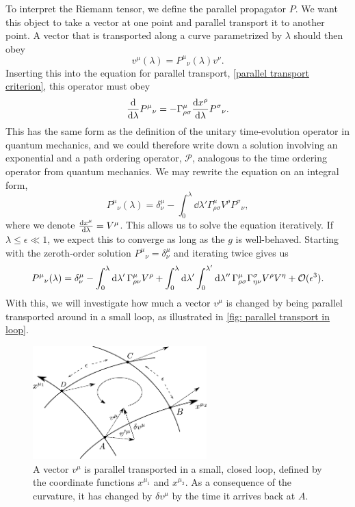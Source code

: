 To interpret the Riemann tensor, we define the parallel propagator $P$.
We want this object to take a vector at one point and parallel transport it to another point.
A vector that is transported along a curve parametrized by $\lambda$ should then obey
%
\begin{equation}
    v^\mu(\lambda) = P^\mu{}_\nu(\lambda) v^\nu.
\end{equation}
%
Inserting this into the equation for parallel transport, \autoref{parallel transport criterion}, this operator must obey
%
\begin{equation}
    \odv{}{\lambda} P^\mu{}_\nu = - \Gamma^\mu_{\rho \sigma}  \odv{x^\rho}{\lambda}P^\sigma{}_\nu.
\end{equation}
%
This has the same form as the definition of the unitary time-evolution operator in quantum mechanics, and we could therefore write down a solution involving an exponential and a path ordering operator, $\mathcal P$, analogous to the time ordering operator from quantum mechanics.
We may rewrite the equation on an integral form,
%
\begin{equation}
    P^\mu{}_\nu(\lambda) = \delta^\mu_\nu 
    - \int^\lambda_0 \dd \lambda' \Gamma^\mu_{\rho \sigma} V^\rho P^\sigma{}_\nu,
\end{equation}
%
where we denote $\odv{x^\mu}{\lambda} = V^\mu$.
This allows us to solve the equation iteratively.
If $\lambda \leq \epsilon \ll 1$, we expect this to converge as long as the $g$ is well-behaved.
Starting with the zeroth-order solution $P^{\mu}{}_\nu = \delta^\mu_\nu$ and iterating twice gives us
%
\begin{equation}
    \label{iterative paralell propagator}
    P^\mu{}_\nu(\lambda) 
    = 
    \delta^\mu_\nu 
    - \int_0^\lambda \mathrm{d} \lambda' \, 
    \Gamma^\mu_{\rho \nu} V^\rho
    + \int_0^{\lambda} \mathrm{d} \lambda ' \int_0^{\lambda'} \mathrm{d} \lambda ''\,
    \Gamma^\mu_{\rho \sigma} \Gamma^\sigma_{\eta \nu} V^\rho V^\eta
    + \mathcal O(\epsilon^3).
\end{equation}
%
With this, we will investigate how much a vector $v^\mu$ is changed by being parallel transported around in a small loop, as illustrated in \autoref{fig: parallel transport in loop}.

\begin{figure}[!htb]
    \centering
    \includegraphics[width=0.6\textwidth]{figurer/parallel_transport.pdf}
    \caption{A vector $v^\mu$ is parallel transported in a small, closed loop, defined by the coordinate functions $x^{\mu_1}$ and $x^{\mu_2}$.
    As a consequence of the curvature, it has changed by $\delta v^\mu$ by the time it arrives back at $A$.}
    \label{fig: parallel transport in loop}
\end{figure}


